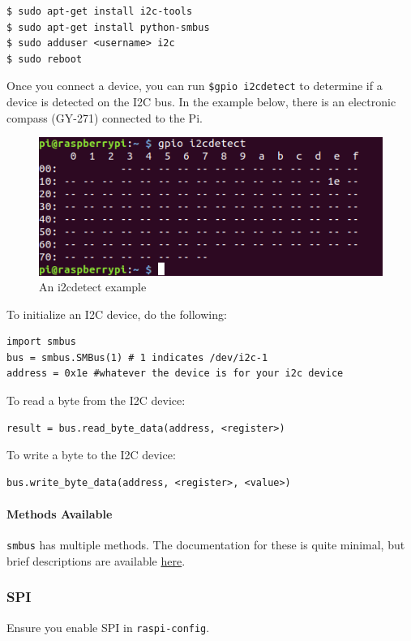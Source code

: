 \begin{lstlisting}
$ sudo apt-get install i2c-tools
$ sudo apt-get install python-smbus
$ sudo adduser <username> i2c
$ sudo reboot
\end{lstlisting}

Once you connect a device, you can run \verb|$gpio i2cdetect| to determine if a device is detected on the I2C bus. In the example below, there is an electronic compass (GY-271) connected to the Pi.
\begin{figure}[H]
\centering
\includegraphics[width=0.7\columnwidth]{Figures/i2cdetect}
\caption{An i2cdetect example}
\label{fig:i2cdetect}
\end{figure}

To initialize an I2C device, do the following:
\begin{lstlisting}
import smbus
bus = smbus.SMBus(1) # 1 indicates /dev/i2c-1
address = 0x1e #whatever the device is for your i2c device
\end{lstlisting}

To read a byte from the I2C device:
\begin{lstlisting}
result = bus.read_byte_data(address, <register>)
\end{lstlisting}

To write a byte to the I2C device:
\begin{lstlisting}
bus.write_byte_data(address, <register>, <value>)
\end{lstlisting}

\paragraph{Methods Available}
\verb|smbus| has multiple methods. The documentation for these is quite minimal, but brief descriptions are available \href{http://wiki.erazor-zone.de/wiki:linux:python:smbus:doc}{here}.

\subsubsection{SPI}
Ensure you enable SPI in \verb|raspi-config|.

